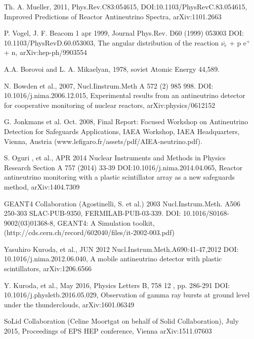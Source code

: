 \documentclass[12pt,a4paper]{article}
\begin{document}
\begin{thebibliography}{9}
Th. A. Mueller, 2011, Phys.Rev.C83:054615, DOI:10.1103/PhysRevC.83.054615, Improved Predictions of Reactor Antineutrino Spectra, arXiv:1101.2663

P. Vogel, J. F. Beacom 1 apr 1999, Journal Phys.Rev. D60 (1999) 053003 DOI: 10.1103/PhysRevD.60.053003, The angular distribution of the reaction $\overline{\nu_e}$ + p \rightarrow e$^+$ + n, arXiv:hep-ph/9903554 

A.A. Borovoi and L. A. Mikaelyan, 1978, soviet Atomic Energy 44,589.

N. Bowden et al., 2007, Nucl.Iinstrum.Meth A 572 (2)  985 998. DOI: 10.1016/j.nima.2006.12.015, Experimental results from an antineutrino detector for cooperative monitoring of nuclear reactors, arXiv:physics/0612152

G. Jonkmans et al. Oct. 2008, Final Report: Focused Workshop on Antineutrino Detection for Safeguards Applications, IAEA Workshop, IAEA Headquarters, Vienna, Austria (www.lefigaro.fr/assets/pdf/AIEA-neutrino.pdf).

S. Oguri , et al., APR 2014 Nuclear Instruments and Methods in Physics Research Section A 757 (2014) 33-39 DOI:10.1016/j.nima.2014.04.065, Reactor antineutrino monitoring with a plastic scintillator array as a new safeguards method, arXiv:1404.7309

GEANT4 Collaboration (Agostinelli, S. et al.) 2003  Nucl.Instrum.Meth. A506 250-303 SLAC-PUB-9350, FERMILAB-PUB-03-339. DOI: 10.1016/S0168-9002(03)01368-8, GEANT4: A Simulation toolkit, (http://cds.cern.ch/record/602040/files/it-2002-003.pdf)

Yasuhiro Kuroda, et al., JUN 2012 Nucl.Instrum.Meth.A690:41-47,2012 DOI: 10.1016/j.nima.2012.06.040, A mobile antineutrino detector with plastic scintillators, arXiv:1206.6566

Y. Kuroda, et al., May 2016, Physics Letters B, 758 12 , pp. 286-291 DOI: 10.1016/j.physletb.2016.05.029, Observation of gamma ray bursts at ground level under the thunderclouds, arXiv:1601.06349

SoLid Collaboration (Celine Moortgat on behalf of Solid Collaboration), July 2015, Proceedings of EPS HEP conference, Vienna arXiv:1511.07603


\end{thebibliography}
\end{document}
